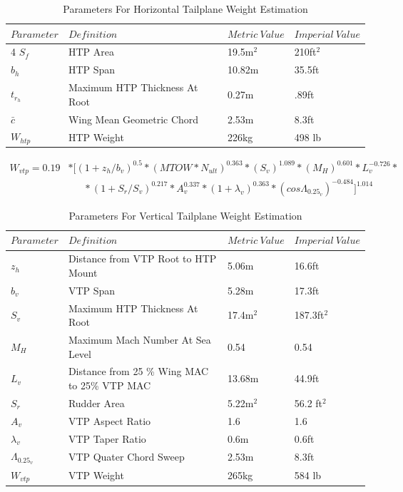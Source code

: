 \documentclass[11pt]{article}
\newcommand{\ra}[1]{\renewcommand{\arraystretch}{#1}}
\begin{document}
\begin{table}[!h]
\centering %
\ra{1.3}
\begin{tabular}{@{}llll@{}}\toprule
$Parameter$ & $Definition$ & $Metric \ Value$ & $Imperial \ Value$ \\
\midrule4
$S_f$& HTP Area & 19.5m$^2$&210ft$^2$\\
$b_h$ & HTP Span & 10.82m & 35.5ft \\ 
$t_{r_{h}}$ & Maximum HTP Thickness At Root & 0.27m & .89ft \\
$\bar{c}$ & Wing Mean Geometric Chord & 2.53m & 8.3ft \\
\midrule
$W_{htp}$ & HTP Weight & 226kg & 498 lb \\
\bottomrule
\end{tabular}
\caption{Parameters For Horizontal Tailplane Weight Estimation}
\label{table:htp}
\end{table}

\FloatBarrier
\begin{equation} \label{eq:vtp} %
\begin{split} 
W_{vtp} =  0.19&*\Big[ (1 + z_{h} / b_{v})^{0.5}*( MTOW*N_{ult})^{0.363} * (S_{v})^{1.089} * (M_{H})^{0.601}* L_{v}^{-0.726}*\\
&\ \ \ \ \ \ \ * (1 + S_{r}/S_{v})^{0.217}*A_{v}^{0.337}*(1 + \lambda_{v})^{0.363}*(cos\Lambda_{0.25_{v}})^{-0.484}\Big]^{1.014}
\end{split}
\end{equation}


\begin{table}[!h]
\centering %
\ra{1.3}
\begin{tabular}{@{}llll@{}}\toprule
$Parameter$ & $Definition$ & $Metric \ Value$ & $Imperial \ Value$ \\
\midrule
$z_h$& Distance from VTP Root to HTP Mount & 5.06m & 16.6ft \\
$b_v$ & VTP Span & 5.28m & 17.3ft \\ 
$S_{v}$ & Maximum HTP Thickness At Root & 17.4m$^2$ & 187.3ft$^2$ \\
$M_{H}$ & Maximum Mach Number At Sea Level & 0.54 & 0.54 \\
$L_{v}$ &  Distance from 25 \% Wing MAC to 25\% VTP MAC & 13.68m & 44.9ft \\
$S_{r}$ & Rudder Area & 5.22m$^2$ & 56.2  ft$^2$ \\
$A_{v}$ &VTP Aspect Ratio & 1.6 & 1.6 \\
$\lambda_{v}$ & VTP Taper Ratio & 0.6m & 0.6ft \\
$\Lambda_{0.25_{v}}$ & VTP Quater Chord Sweep & 2.53m & 8.3ft \\
\midrule
$W_{vtp}$ & VTP Weight & 265kg & 584 lb \\
\bottomrule
\end{tabular}
\caption{Parameters For Vertical Tailplane Weight Estimation}
\label{table:vtp}
\end{table}
\FloatBarrier
\end{document}
